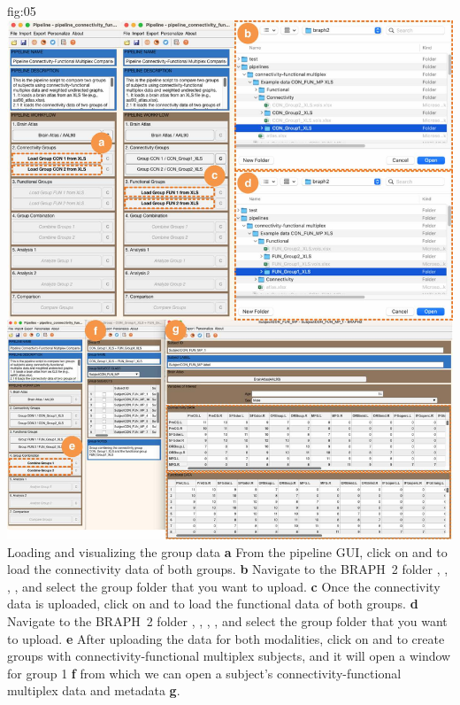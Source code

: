 \documentclass[justified]{tufte-handout}
\begin{document}
	{fig:05}
	{\includegraphics{fig05.jpg}}
	{Loading and visualizing the group data}
	{
	{\bf a} From the pipeline GUI, click on  and  to load the connectivity data of both groups.
   	{\bf b} Navigate to the BRAPH~2 folder , , , , and select the group folder that you want to upload. 
        {\bf c} Once the connectivity data is uploaded, click on  and  to load the functional data of both groups.
   	{\bf d} Navigate to the BRAPH~2 folder , , , , and select the group folder that you want to upload. 
   	{\bf e} After uploading the data for both modalities, click on  and  to create groups with connectivity-functional multiplex subjects, and it will open a window for group 1 {\bf f} from which we can open a subject’s connectivity-functional
multiplex data and metadata {\bf g}.
	}
\end{document}
